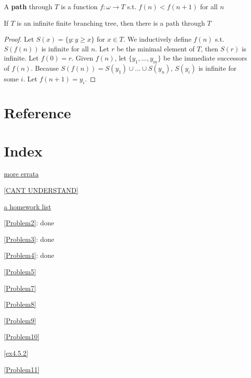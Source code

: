 \documentclass[11pt]{article}
\begin{document}
A \textbf{path} through \(T\) is a function \(f:\omega\to T\) s.t. \(f(n)<f(n+1)\) for all \(n\)

\begin{lemma}
\label{lemmaA.21}
If \(T\) is an infinite finite branching tree, then there is a path through \(T\)
\end{lemma}

\begin{proof}
Let \(S(x)=\{y:y\ge x\}\) for \(x\in T\). We inductively define \(f(n)\) s.t. \(S(f(n))\) is infinite
for all \(n\). Let \(r\) be the minimal element of \(T\), then \(S(r)\) is infinite.
Let \(f(0)=r\). Given \(f(n)\), let \(\{y_1,\dots,y_m\}\) be the immediate successors of \(f(n)\).
Because \(S(f(n))=S(y_1)\cup\dots\cup S(y_n)\), \(S(y_i)\) is infinite for some \(i\). Let \(f(n+1)=y_i\).
\end{proof}


\section{Reference}
\label{sec:org39259fa}


\section{Index}
\label{sec:org64422ab}
\renewcommand{\indexname}{}
\printindex
\appendix
\href{https://people.math.wisc.edu/\~lempp/teach/Marker-errata.html}{more errata}

\ref{CANT UNDERSTAND}

\href{https://people.math.wisc.edu/\~omer/Math776/}{a homework list}

\ref{Problem2}: done


\ref{Problem3}: done


\ref{Problem4}: done


\ref{Problem5}

\ref{Problem7}

\ref{Problem8}

\ref{Problem9}

\ref{Problem10}

\ref{ex4.5.2}

\ref{Problem11}
\end{document}
